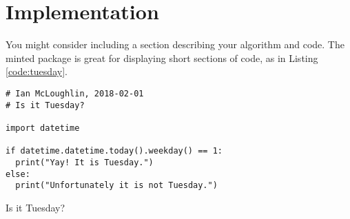 \chapter{Implementation}
You might consider including a section describing your algorithm and code.
The minted package is great for displaying short sections of code, as in 
Listing \ref{code:tuesday}.

\lipsum[29]

\begin{listing}
  \begin{verbatim}
# Ian McLoughlin, 2018-02-01
# Is it Tuesday?

import datetime

if datetime.datetime.today().weekday() == 1:
  print("Yay! It is Tuesday.")
else:
  print("Unfortunately it is not Tuesday.")
  \end{verbatim}
  \caption{Is it Tuesday?}
  \label{code:tuesday}
\end{listing}

\lipsum[10-15]